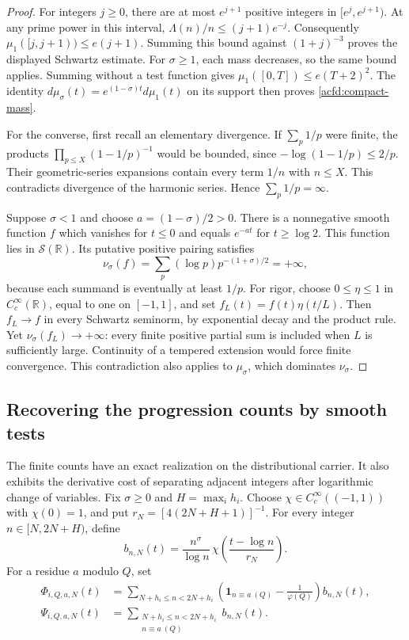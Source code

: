 \begin{proof}
For integers $j\geq0$, there are at most $e^{j+1}$ positive integers
in $[e^j,e^{j+1})$.  At any prime power in this interval,
$\Lambda(n)/n\leq(j+1)e^{-j}$.
Consequently $\mu_1([j,j+1))\leq e(j+1)$.
Summing this bound against $(1+j)^{-3}$ proves the displayed Schwartz estimate.
For $\sigma\geq1$, each mass decreases, so the same bound applies.
Summing without a test function gives
$\mu_1([0,T])\leq e(T+2)^2$.
The identity $d\mu_\sigma(t)=e^{(1-\sigma)t}d\mu_1(t)$ on its support
then proves \eqref{acfd:compact-mass}.

For the converse, first recall an elementary divergence.
If $\sum_p1/p$ were finite, the products
$\prod_{p\leq X}(1-1/p)^{-1}$ would be bounded, since
$-\log(1-1/p)\leq2/p$.
Their geometric-series expansions contain every term $1/n$ with $n\leq X$.
This contradicts divergence of the harmonic series.  Hence $\sum_p1/p=\infty$.

Suppose $\sigma<1$ and choose $a=(1-\sigma)/2>0$.
There is a nonnegative smooth function $f$ which vanishes for $t\leq0$
and equals $e^{-at}$ for $t\geq\log2$.
This function lies in $\mathcal S(\mathbb R)$.
Its putative positive pairing satisfies
\[
 \nu_\sigma(f)
   =\sum_p(\log p)p^{-(1+\sigma)/2}=+\infty,
\]
because each summand is eventually at least $1/p$.
For rigor, choose $0\leq\eta\leq1$ in $C_c^\infty(\mathbb R)$,
equal to one on $[-1,1]$, and set $f_L(t)=f(t)\eta(t/L)$.
Then $f_L\to f$ in every Schwartz seminorm, by exponential decay and
the product rule.  Yet $\nu_\sigma(f_L)\to+\infty$:
every finite positive partial sum is included when $L$ is sufficiently large.
Continuity of a tempered extension would force finite convergence.
This contradiction also applies to $\mu_\sigma$, which dominates $\nu_\sigma$.
\end{proof}

\subsection{Recovering the progression counts by smooth tests}

The finite counts have an exact realization on the distributional carrier.
It also exhibits the derivative cost of separating adjacent integers after logarithmic change of variables.
Fix $\sigma\geq0$ and $H=\max_i h_i$.
Choose $\chi\in C_c^\infty((-1,1))$ with $\chi(0)=1$, and put
$r_N=[4(2N+H+1)]^{-1}$.
For every integer $n\in[N,2N+H)$, define
\[
 b_{n,N}(t)=\frac{n^\sigma}{\log n}\,
                 \chi\left(\frac{t-\log n}{r_N}\right).
\]
For a residue $a$ modulo $Q$, set
\begin{align*}
 \Phi_{i,Q,a,N}(t)
   &=\sum_{N+h_i\leq n<2N+h_i}
          \left(\mathbf1_{n\equiv a\ (Q)}-\frac1{\varphi(Q)}\right)b_{n,N}(t),\\
 \Psi_{i,Q,a,N}(t)
   &=\sum_{\substack{N+h_i\leq n<2N+h_i\\n\equiv a\ (Q)}}b_{n,N}(t).
\end{align*}

